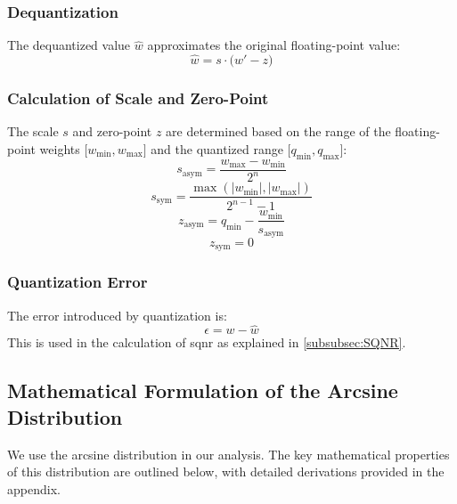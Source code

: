 \documentclass{ioereport}
\begin{document}
\subsubsection{Dequantization}
The dequantized value \( \hat{w} \) approximates the original floating-point value:
\begin{equation}
\hat{w} = s \cdot \bigl(w' - z\bigr)
\label{eq:dequantization}
\end{equation}

\subsubsection{Calculation of Scale and Zero-Point}
The scale \( s \) and zero-point \( z \) are determined based on 
the range of the floating-point weights \(\bigl[w_{\text{min}}, w_{\text{max}}\bigr]\) 
and the quantized range \(\bigl[q_{\text{min}}, q_{\text{max}}\bigr]\):
\begin{equation}
    s_{\text{asym}} = \frac{w_{\text{max}} - w_{\text{min}}}{2^n}
\label{eq:calc_scale_asym}
\end{equation}
\begin{equation}
    s_{\text{sym}} = \frac{\max\left(|w_{\text{min}}|, |w_{\text{max}}|\right)}{2^{n-1} - 1}
\label{eq:calc_scale_sym}
\end{equation}
\begin{equation}
    z_{\text{asym}} = q_{\text{min}} - \frac{w_{\text{min}}}{s_{\text{asym}}}
\label{eq:calc_zero_point_asym}
\end{equation}
\begin{equation}
    z_{\text{sym}} = 0
\label{eq:calc_zero_point_sym}
\end{equation}


\subsubsection{Quantization Error}
The error introduced by quantization is:
\begin{equation}
\epsilon = w - \hat{w}
\label{eq:quant_error}
\end{equation}
This is used in the calculation of \gls{sqnr} as explained in \autoref{subsubsec:SQNR}.

\subsection{Mathematical Formulation of the Arcsine Distribution}

We use the arcsine distribution in our analysis. The key mathematical properties of this distribution are outlined below, with detailed derivations provided in the appendix.
\end{document}
